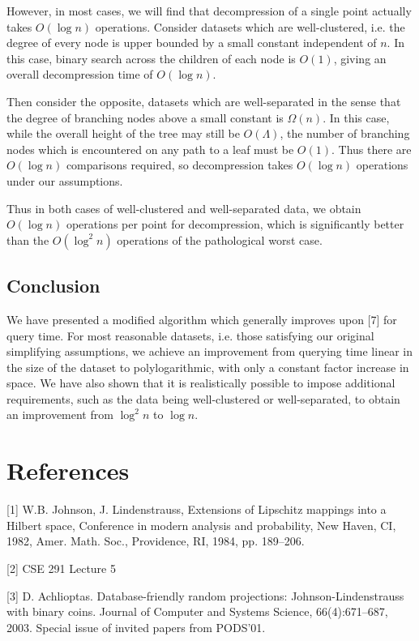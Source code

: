 \documentclass{article}
\begin{document}
However, in most cases, we will find that decompression of a single point
actually takes $O(\log n)$ operations. Consider datasets which are
well-clustered, i.e. the degree of every node is upper bounded by a small
constant independent of $n$. In this case, binary search across the children of
each node is $O(1)$, giving an overall decompression time of $O(\log n)$.

Then consider the opposite, datasets which are well-separated in the sense that
the degree of branching nodes above a small constant is $\Omega(n)$. In this case,
while the overall height of the tree may still be $O(\Lambda)$, the number of
branching nodes which is encountered on any path to a leaf must be $O(1)$. Thus
there are $O(\log n)$ comparisons required, so decompression takes $O(\log n)$
operations under our assumptions.

Thus in both cases of well-clustered and well-separated data, we obtain $O(\log
n)$ operations per point for decompression, which is significantly better than
the $O(\log^2 n)$ operations of the pathological worst case.

\subsection{Conclusion}

We have presented a modified algorithm which generally improves upon [7] for
query time. For most reasonable datasets, i.e. those satisfying our original
simplifying assumptions, we achieve an improvement from querying time linear in
the size of the dataset to polylogarithmic, with only a constant factor increase
in space. We have also shown that it is realistically possible to impose
additional requirements, such as the data being well-clustered or
well-separated, to obtain an improvement from $\log^2 n$ to $\log n$.

\section{References}

[1] W.B. Johnson, J. Lindenstrauss, Extensions of Lipschitz mappings into a
Hilbert space, Conference in modern analysis and probability, New Haven, CI,
1982, Amer. Math. Soc., Providence, RI, 1984, pp. 189–206.

[2] CSE 291 Lecture 5

[3] D. Achlioptas. Database-friendly random projections: Johnson-Lindenstrauss
with binary coins. Journal of Computer and Systems Science, 66(4):671–687, 2003.
Special issue of invited papers from PODS’01.
\end{document}
